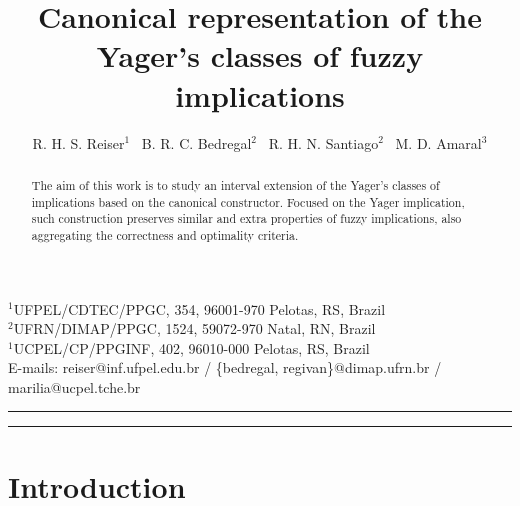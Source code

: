\documentclass[conference]{IEEEtran}
\title{Canonical representation of the Yager's classes of fuzzy implications}
\author{\scriptsize R. H. S. Reiser$^{1}$ \  B. R. C. Bedregal$^{2}$ \ R. H. N. Santiago$^{2}$ \ M. D. Amaral$^{3}$
}
\date{}
\theoremstyle{plain}
\theoremstyle{remark}
\theoremstyle{definition}
\theoremstyle{proposition}
\begin{document}
\maketitle

\vspace{-20pt}
\begin{center}
{\footnotesize $^1$UFPEL/CDTEC/PPGC, 354, 96001-970 Pelotas, RS, Brazil \\
$^2$UFRN/DIMAP/PPGC, 1524, 59072-970 Natal, RN, Brazil \\
$^1$UCPEL/CP/PPGINF, 402, 96010-000  Pelotas, RS, Brazil \\
E-mails: reiser@inf.ufpel.edu.br / \{bedregal, regivan\}@dimap.ufrn.br  / marilia@ucpel.tche.br
}\end{center}

\hrule

\begin{abstract}
The aim of this work is to study an interval extension of the Yager's classes of implications based on the canonical constructor. Focused on the Yager implication, such construction preserves similar and extra properties of fuzzy implications, also aggregating the correctness and optimality criteria.

\end{abstract}

\medskip
\noindent
{}

\medskip
\noindent
{}
\medskip

\hrule

\section{Introduction}\label{sec:1}
\end{document}
